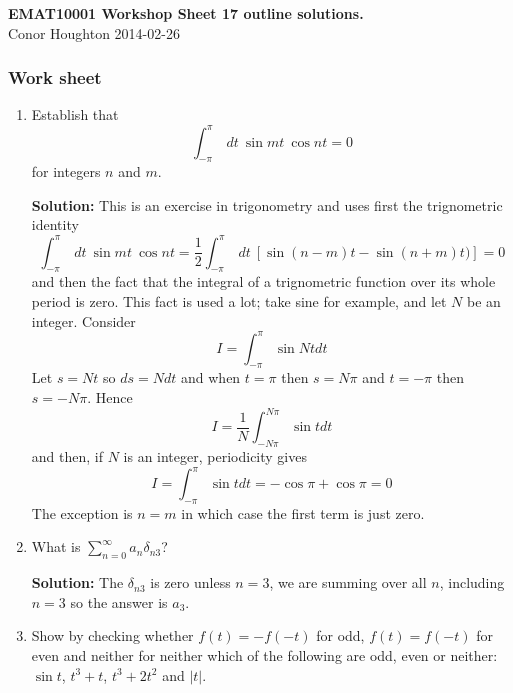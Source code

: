 \documentclass[12pt]{article}
\begin{document}
\begin{center}
{\bf EMAT10001 Workshop Sheet 17 outline solutions.}\\[1cm]{} Conor Houghton 2014-02-26
\end{center}

\subsubsection*{Work sheet}

\begin{enumerate}

\item Establish that
\begin{equation}
\int^\pi_{-\pi}~dt~ \sin mt ~\cos nt=0
\end{equation}
for integers $n$ and $m$.

\textbf{Solution: } This is an exercise in trigonometry and uses first the trignometric identity
\begin{equation}
\int^\pi_{-\pi}~dt~ \sin mt ~\cos nt=\frac{1}{2}\int^\pi_{-\pi}~dt~ [\sin{(n-m)t}-\sin{(n+m)t)}]=0
\end{equation}
and then the fact that the integral of a trignometric function over its whole period is zero. This fact is used a lot; take sine for example, and let $N$ be an integer. Consider
\begin{equation}
I=\int_{-\pi}^\pi {\sin{Nt}}dt
\end{equation}
Let $s=Nt$ so $ds=Ndt$ and when $t=\pi$ then $s=N\pi$ and $t=-\pi$ then $s=-N\pi$. Hence
\begin{equation}
I=\frac{1}{N}\int_{-N\pi}^{N\pi} {\sin{t}}dt
\end{equation}
and then, if $N$ is an integer, periodicity gives
\begin{equation}
I=\int_{-\pi}^{\pi} {\sin{t}}dt=-\cos{\pi}+\cos{\pi}=0
\end{equation}
The exception is $n=m$ in which case the first term is just zero. 

\item What is $\sum_{n=0}^\infty a_n\delta_{n3}$?

\textbf{Solution: } The $\delta_{n3}$ is zero unless $n=3$, we are summing over all $n$, including $n=3$ so the answer is $a_3$.

\item Show by checking whether $f(t)=-f(-t)$ for odd, $f(t)=f(-t)$ for even and neither for neither which of the following are odd, even or neither: $\sin{t}$, $t^3+t$, $t^3+2t^2$ and $|t|$.


\end{enumerate}
\end{document}
